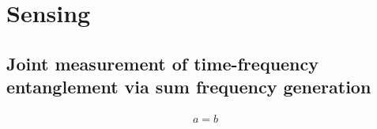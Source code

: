 \documentclass[../../note.tex]{subfiles}
\begin{document}
\chapter{Sensing}
\section{Joint measurement of time-frequency entanglement via sum frequency generation}
\begin{lemma}
    \begin{align}
        a=b
    \end{align}
\end{lemma}
\end{document}
